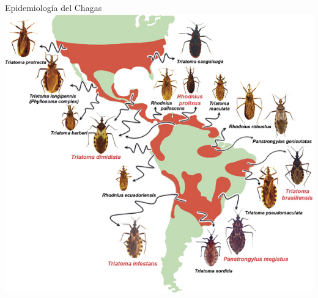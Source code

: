 \documentclass{beamer}
\begin{document}

\begin{frame}{Epidemiología del Chagas}
			\includegraphics[height=.9\textheight]{slides/triatomine-map.jpg}
\end{frame}
\end{document}
